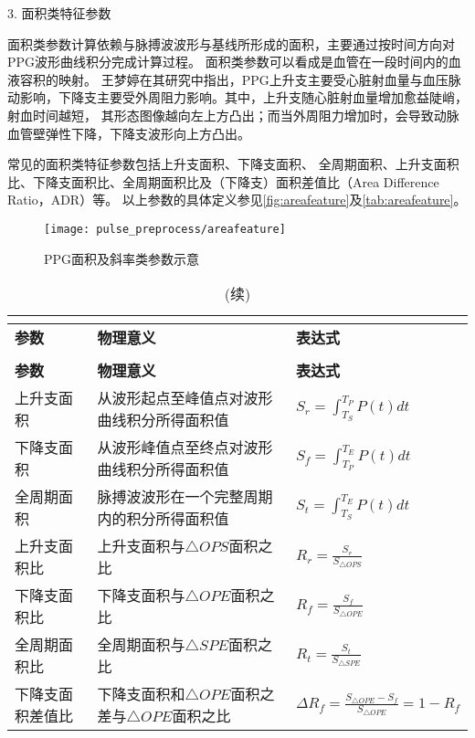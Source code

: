 3. 面积类特征参数

面积类参数计算依赖与脉搏波波形与基线所形成的面积，主要通过按时间方向对PPG波形曲线积分完成计算过程。
面积类参数可以看成是血管在一段时间内的血液容积的映射。
王梦婷在其研究中指出\cite{mmt}，PPG上升支主要受心脏射血量与血压脉动影响，下降支主要受外周阻力影响。其中，上升支随心脏射血量增加愈益陡峭，射血时间越短，
其形态图像越向左上方凸出；而当外周阻力增加时，会导致动脉血管壁弹性下降，下降支波形向上方凸出。

常见的面积类特征参数包括上升支面积、下降支面积、
全周期面积、上升支面积比、下降支面积比、全周期面积比及（下降支）面积差值比（Area Difference Ratio，ADR）\cite{Feng2018}等。
以上参数的具体定义参见\autoref{fig:areafeature}及\autoref{tab:areafeature}。
\begin{figure}[htbp]
    \centering
    \texttt{[image: pulse\_preprocess/areafeature]}
    \caption{\label{fig:areafeature}PPG面积及斜率类参数示意}
\end{figure}

\begin{center}
	\begin{longtable}{m{3.5cm}<{\centering}m{6.5cm}<{\centering}m{4.5cm}<{\centering}}
		\caption{PPG面积类参数示意}\\
		\label{tab:areafeature}\\
        \toprule
        \textbf{参数} & \textbf{物理意义} & \textbf{表达式} \\
        \midrule
        \endfirsthead
        \caption[]{(续)}\\
        \toprule
        \textbf{参数} & \textbf{物理意义} & \textbf{表达式} \\
        \midrule
        \endhead 
        \midrule
        \endfoot
        \bottomrule
        \endlastfoot
        上升支面积      &  从波形起点至峰值点对波形曲线积分所得面积值         &  $S_r=\int_{T_S}^{T_P}P(t)dt$\\
        下降支面积      &  从波形峰值点至终点对波形曲线积分所得面积值         &  $S_f=\int_{T_P}^{T_E}P(t)dt$\\
        全周期面积      &  脉搏波波形在一个完整周期内的积分所得面积值         &  $S_t=\int_{T_S}^{T_E}P(t)dt$\\
        上升支面积比    &  上升支面积与$\triangle OPS$面积之比         &   $R_r=\frac{S_r}{S_{\triangle OPS}}$    \\
        下降支面积比    &  下降支面积与$\triangle OPE$面积之比        &   $R_f=\frac{S_f}{S_{\triangle OPE}}$    \\
        全周期面积比    &  全周期面积与$\triangle SPE$面积之比         &   $R_t=\frac{S_t}{S_{\triangle SPE}}$    \\
        下降支面积差值比&  下降支面积和$\triangle OPE$面积之差与$\triangle OPE$面积之比        &    $\Delta R_f=\frac{S_{\triangle OPE}-S_f}{S_{\triangle OPE}}=1-R_f$\\
	\end{longtable}
\end{center}

